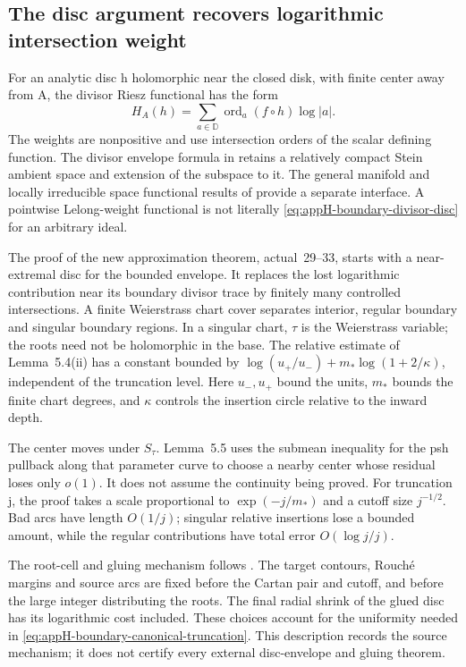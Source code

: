 \subsection{The disc argument recovers logarithmic intersection weight}
\label{sec:appH-boundary-disc-weight}

For an analytic disc h holomorphic near the closed disk, with finite
center away from A, the divisor Riesz functional has the form
\[
 H_A(h)=\sum_{a\in\mathbb D}
           \operatorname{ord}_a(f\circ h)\log|a|.
 \tag{H.21}\label{eq:appH-boundary-divisor-disc}
\]
The weights are nonpositive and use intersection orders of the scalar
defining function. The divisor envelope formula in
\cite[Theorem~3.3, printed~1526--1527]{LarussonSigurdsson99GreenPublished}
retains a relatively compact Stein ambient space and extension of
the subspace to it. The general manifold and locally irreducible
space functional results of
\cite[Theorem~1.1 and functional definitions, printed~172--174]{DrinovecForstneric12DiscPublished}
provide a separate interface. A pointwise Lelong-weight functional
is not literally \eqref{eq:appH-boundary-divisor-disc} for an
arbitrary ideal.

The proof of the new approximation theorem, actual~29--33, starts
with a near-extremal disc for the bounded envelope. It replaces
the lost logarithmic contribution near its boundary divisor trace
by finitely many controlled intersections. A finite Weierstrass
chart cover separates interior, regular boundary and singular
boundary regions. In a singular chart, \(\tau\) is the Weierstrass
variable; the roots need not be holomorphic in the base. The
relative estimate of Lemma~5.4(ii) has a constant bounded by
\(\log(u_+/u_-)+m_*\log(1+2/\kappa)\), independent of the
truncation level. Here \(u_-,u_+\) bound the units, \(m_*\) bounds
the finite chart degrees, and \(\kappa\) controls the insertion
circle relative to the inward depth.

The center moves under \(S_\tau\). Lemma~5.5 uses the submean
inequality for the psh pullback along that parameter curve to
choose a nearby center whose residual loses only \(o(1)\).
It does not assume the continuity being proved. For truncation j,
the proof takes a scale proportional to \(\exp(-j/m_*)\) and a
cutoff size \(j^{-1/2}\). Bad arcs have length \(O(1/j)\);
singular relative insertions lose a bounded amount, while the
regular contributions have total error \(O(\log j/j)\).

The root-cell and gluing mechanism follows
\cite[Lemma~3.2 and Theorem~3.1, printed~179--184]{DrinovecForstneric12DiscPublished}.
The target contours, Rouch\'e margins and source arcs are fixed
before the Cartan pair and cutoff, and before the large integer
distributing the roots. The final radial shrink of the glued disc
has its logarithmic cost included. These choices account for the
uniformity needed in \eqref{eq:appH-boundary-canonical-truncation}.
This description records the source mechanism; it does not certify
every external disc-envelope and gluing theorem.


